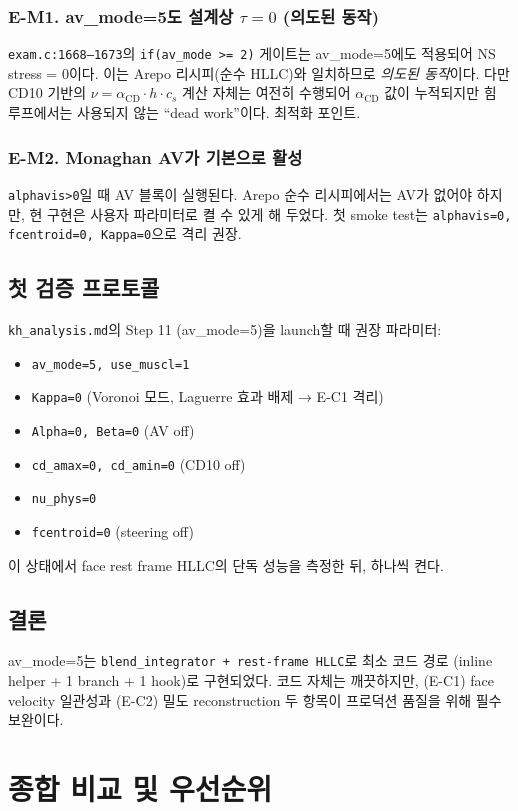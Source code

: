 \documentclass[11pt]{article}
\begin{document}
\subsubsection*{E-M1. av\_mode=5도 설계상 $\tau=0$ (의도된 동작)}
\texttt{exam.c:1668--1673}의 \texttt{if(av\_mode >= 2)} 게이트는
av\_mode=5에도 적용되어 NS stress = 0이다. 이는 Arepo 리시피(순수 HLLC)와
일치하므로 \emph{의도된 동작}이다. 다만 CD10 기반의 $\nu = \alpha_\mathrm{CD}\cdot h\cdot c_s$
계산 자체는 여전히 수행되어 $\alpha_\mathrm{CD}$ 값이 누적되지만
힘 루프에서는 사용되지 않는 ``dead work''이다. 최적화 포인트.

\subsubsection*{E-M2. Monaghan AV가 기본으로 활성}
\texttt{alphavis>0}일 때 AV 블록이 실행된다. Arepo 순수 리시피에서는
AV가 없어야 하지만, 현 구현은 사용자 파라미터로 켤 수 있게 해 두었다.
첫 smoke test는 \texttt{alphavis=0, fcentroid=0, Kappa=0}으로 격리 권장.

\subsection{첫 검증 프로토콜}
\texttt{kh\_analysis.md}의 Step 11 (av\_mode=5)을 launch할 때 권장 파라미터:
\begin{itemize}
  \item \texttt{av\_mode=5, use\_muscl=1}
  \item \texttt{Kappa=0} (Voronoi 모드, Laguerre 효과 배제 → E-C1 격리)
  \item \texttt{Alpha=0, Beta=0} (AV off)
  \item \texttt{cd\_amax=0, cd\_amin=0} (CD10 off)
  \item \texttt{nu\_phys=0}
  \item \texttt{fcentroid=0} (steering off)
\end{itemize}
이 상태에서 face rest frame HLLC의 단독 성능을 측정한 뒤, 하나씩 켠다.

\subsection{결론}
av\_mode=5는 \texttt{blend\_integrator + rest-frame HLLC}로 최소 코드 경로
(inline helper + 1 branch + 1 hook)로 구현되었다. 코드 자체는 깨끗하지만,
(E-C1) face velocity 일관성과 (E-C2) 밀도 reconstruction 두 항목이
프로덕션 품질을 위해 필수 보완이다.


\section{종합 비교 및 우선순위}
\end{document}
